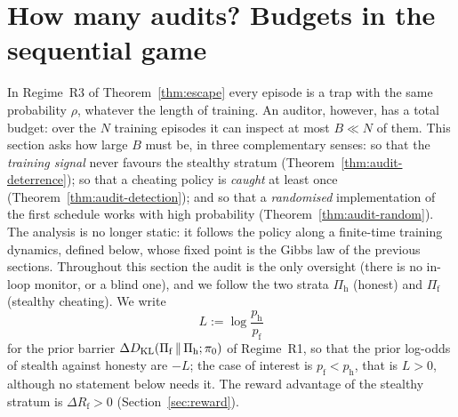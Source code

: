 \section{How many audits? Budgets in the sequential game}
\label{sec:audit-budget}

In Regime~R3 of Theorem~\ref{thm:escape} every episode is a trap with the
same probability $\rho$, whatever the length of training. An auditor,
however, has a total budget: over the $N$ training episodes it can inspect at
most $B\ll N$ of them. This section asks how large $B$ must be, in three
complementary senses: so that the \emph{training signal} never favours the
stealthy stratum (Theorem~\ref{thm:audit-deterrence}); so that a cheating
policy is \emph{caught} at least once (Theorem~\ref{thm:audit-detection}); and
so that a \emph{randomised} implementation of the first schedule works with
high probability (Theorem~\ref{thm:audit-random}). The analysis is no longer
static: it follows the policy along a finite-time training dynamics, defined
below, whose fixed point is the Gibbs law of the previous sections. Throughout
this section the audit is the only oversight (there is no in-loop monitor, or
a blind one), and we follow the two strata $\Pi_{\mathrm h}$ (honest) and
$\Pi_{\mathrm f}$ (stealthy cheating). We write
\[
  L:=\log\frac{p_{\mathrm h}}{p_{\mathrm f}}
\]
for the prior barrier
$\Delta D_{\mathrm{KL}}(\Pi_{\mathrm f}\,\|\,\Pi_{\mathrm h};\pi_0)$ of Regime~R1, so that
the prior log-odds of stealth against honesty are $-L$; the case of interest
is $p_{\mathrm f}<p_{\mathrm h}$, that is $L>0$, although no statement below
needs it. The reward advantage of the stealthy stratum is
$\Delta R_{\mathrm f}>0$ (Section~\ref{sec:reward}).


